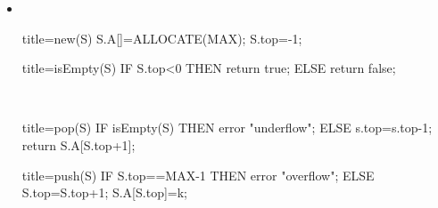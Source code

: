 \documentclass[
    12pt,
    a4paper,
    ngerman,
    color=3b,%
    marginpar=false,
    colorback=false,
    leqno,
]{tudaexercise}
\begin{document}
\begin{itemize}
    \item {}\\
          \begin{minipage}[t]{.4\textwidth}
              \begin{codeBlock}[autogobble]{title=new(S)}
                  S.A[]=ALLOCATE(MAX);
                  S.top=-1;
              \end{codeBlock}
          \end{minipage}
          \begin{minipage}[t]{.4\textwidth}
              \begin{codeBlock}[autogobble]{title=isEmpty(S)}
                  IF S.top<0 THEN
                    return true;
                  ELSE
                    return false;
              \end{codeBlock}
          \end{minipage}
          \\
          \begin{minipage}[t]{.4\textwidth}
              \begin{codeBlock}[autogobble]{title=pop(S)}
                  IF isEmpty(S) THEN
                    error "underflow";
                  ELSE
                    s.top=s.top-1;
                    return S.A[S.top+1];
              \end{codeBlock}
          \end{minipage}
          \begin{minipage}[t]{.4\textwidth}
              \begin{codeBlock}[autogobble]{title=push(S)}
                  IF S.top==MAX-1 THEN
                    error "overflow";
                  ELSE
                    S.top=S.top+1;
                    S.A[S.top]=k;
              \end{codeBlock}
          \end{minipage}


\end{itemize}
\end{document}
